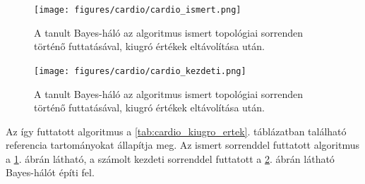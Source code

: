\begin{figure}[htp]
    \centering
    \texttt{[image: figures/cardio/cardio\_ismert.png]}
    \caption{A tanult Bayes-háló az algoritmus ismert topológiai sorrenden történő futtatásával, kiugró értékek eltávolítása után.}
    \label{fig:cardio_kiugro_ertek}
\end{figure}

\begin{figure}[htp]
    \centering
    \texttt{[image: figures/cardio/cardio\_kezdeti.png]}
    \caption{A tanult Bayes-háló az algoritmus ismert topológiai sorrenden történő futtatásával, kiugró értékek eltávolítása után.}
    \label{fig:cardio_kiugro_ertek_kezdeti}
\end{figure}

Az így futtatott algoritmus a \ref{tab:cardio_kiugro_ertek}. táblázatban található referencia tartományokat állapítja meg. Az ismert sorrenddel futtatott algoritmus a \ref{fig:cardio_kiugro_ertek}. ábrán látható, a számolt kezdeti sorrenddel futtatott a \ref{fig:cardio_kiugro_ertek_kezdeti}. ábrán látható Bayes-hálót építi fel.

